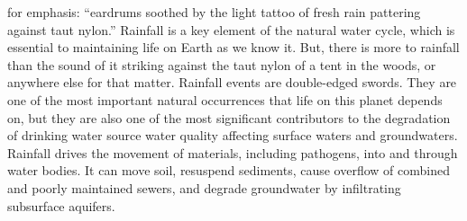\documentclass{article}
\begin{document}
for emphasis: ``eardrums soothed by the light tattoo of fresh rain
pattering against taut nylon.'' Rainfall is a key element of the natural
water cycle, which is essential to maintaining life on Earth as we know
it. But, there is more to rainfall than the sound of it striking against
the taut nylon of a tent in the woods, or anywhere else for that matter.
Rainfall events are double-edged swords. They are one of the most
important natural occurrences that life on this planet depends on, but
they are also one of the most significant contributors to the
degradation of drinking water source water quality affecting surface
waters and groundwaters. Rainfall drives the movement of materials,
including pathogens, into and through water bodies. It can move soil,
resuspend sediments, cause overflow of combined and poorly maintained
sewers, and degrade groundwater by infiltrating subsurface aquifers.
\end{document}
